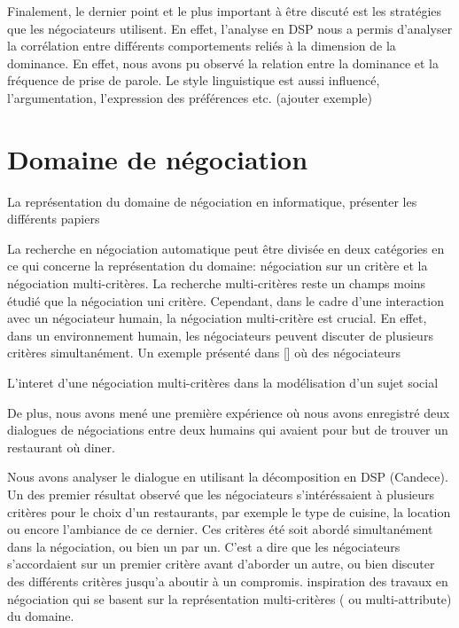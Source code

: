 		 Finalement, le dernier point et le plus important à être discuté est les stratégies que les négociateurs utilisent. En effet, l'analyse en DSP nous a permis d'analyser la corrélation entre différents comportements reliés à la dimension de la dominance. En effet, nous avons pu observé la relation entre la dominance et la fréquence de prise de parole. Le style linguistique est aussi influencé, l'argumentation, l'expression des préférences etc. 
		 (ajouter exemple)
		 
		  
		
	

\section{Domaine de négociation}

	La représentation du domaine de négociation en  informatique, présenter les différents papiers


	
	
	La recherche en négociation automatique peut être divisée en deux catégories en ce qui concerne la représentation du domaine: négociation sur un critère et la négociation multi-critères. La recherche multi-critères reste un champs moins étudié que la négociation uni critère. Cependant, dans le cadre d'une interaction avec un négociateur humain, la négociation multi-critère est crucial. En effet, dans un environnement humain, les négociateurs peuvent discuter de plusieurs critères simultanément. Un exemple présenté dans [] où des négociateurs
	

	L'interet d'une négociation multi-critères dans la modélisation d'un sujet social
	
	De plus, nous avons mené une première expérience où nous avons enregistré deux dialogues de négociations entre deux humains qui avaient pour but de trouver un restaurant où diner.
	
	Nous avons analyser le dialogue en utilisant la décomposition en DSP (Candece). Un des premier résultat observé que les négociateurs s'intéréssaient à plusieurs critères pour le choix d'un restaurants, par exemple le type de cuisine, la location ou encore l'ambiance de ce dernier. Ces critères été soit abordé simultanément dans la négociation, ou bien un par un. C'est a dire que les négociateurs s'accordaient sur un premier critère avant d'aborder un autre, ou bien discuter des différents critères jusqu'a aboutir à un compromis.
		inspiration des travaux en négociation qui se basent sur la représentation multi-critères ( ou multi-attribute) du domaine.
		

